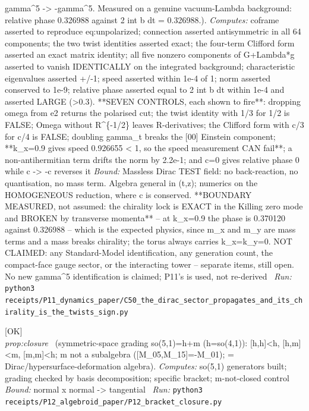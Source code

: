 \begin{description}
gamma\textasciicircum{}5 -> -gamma\textasciicircum{}5. Measured on a genuine vacuum-Lambda background: relative phase 0.326988 against 2 int b dt = 0.326988.). 
\emph{Computes:} coframe asserted to reproduce eq:unpolarized; connection asserted antisymmetric in all 64 components; the two twist identities asserted exact; the four-term Clifford form asserted an exact matrix identity; all five nonzero components of G+Lambda*g asserted to vanish IDENTICALLY on the integrated background; characteristic eigenvalues asserted +/-1; speed asserted within 1e-4 of 1; norm asserted conserved to 1e-9; relative phase asserted equal to 2 int b dt within 1e-4 and asserted LARGE (>0.3). **SEVEN CONTROLS, each shown to fire**: dropping omega from e2 returns the polarised cut; the twist identity with 1/3 for 1/2 is FALSE; Omega without R\textasciicircum{}\{-1/2\} leaves R-derivatives; the Clifford form with c/3 for c/4 is FALSE; doubling gamma\_t breaks the [00] Einstein component; **k\_x=0.9 gives speed 0.926655 < 1, so the speed measurement CAN fail**; a non-antihermitian term drifts the norm by 2.2e-1; and c=0 gives relative phase 0 while c -> -c reverses it
 \emph{Bound:} Massless Dirac TEST field: no back-reaction, no quantisation, no mass term. Algebra general in (t,z); numerics on the HOMOGENEOUS reduction, where c is conserved. **BOUNDARY MEASURED, not assumed: the chirality lock is EXACT in the Killing zero mode and BROKEN by transverse momenta** -- at k\_x=0.9 the phase is 0.370120 against 0.326988 -- which is the expected physics, since m\_x and m\_y are mass terms and a mass breaks chirality; the torus always carries k\_x=k\_y=0. NOT CLAIMED: any Standard-Model identification, any generation count, the compact-face gauge sector, or the interacting tower -- separate items, still open. No new gamma\textasciicircum{}5 identification is claimed; P11's is used, not re-derived
\ \emph{Run:} \texttt{python3 receipts/P11\_dynamics\_paper/C50\_the\_dirac\_sector\_propagates\_and\_its\_chirality\_is\_the\_twists\_sign.py}
\item[\label{rcpt:P12_bracket_closure}\texttt{P12\_bracket\_closure}]\hfill\textsf{[OK]}\\
\textit{prop:closure} \ (symmetric-space grading so(5,1)=h+m (h=so(4,1)): [h,h]<h, [h,m]<m, [m,m]<h; m not a subalgebra ([M\_05,M\_15]=-M\_01); = Dirac/hypersurface-deformation algebra). 
\emph{Computes:} so(5,1) generators built; grading checked by basis decomposition; specific bracket; m-not-closed control
 \emph{Bound:} normal x normal -> tangential
\ \emph{Run:} \texttt{python3 receipts/P12\_algebroid\_paper/P12\_bracket\_closure.py}

\end{description}
